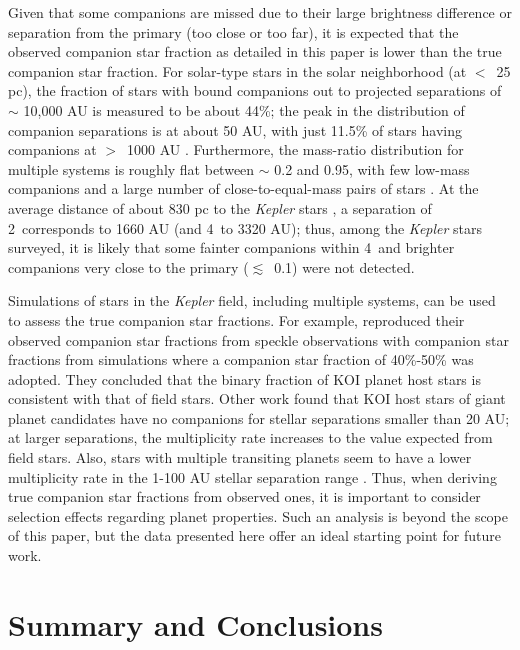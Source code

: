\documentclass[twocolumn,appendixfloats]{aastex6}
\begin{document}
Given that some companions are missed due to their large brightness 
difference or separation from the primary (too close or too far), it is expected 
that the observed companion star fraction as detailed in this paper is lower 
than the true companion star fraction. For solar-type stars in the solar 
neighborhood (at $<$~25 pc), the fraction of stars with bound companions 
out to projected separations of $\sim$ 10,000 AU is measured to be
about 44\%; the peak in the distribution of companion separations is at about 
50 AU, with just 11.5\% of stars having companions at $>$~1000 AU 
\citep{raghavan10}. Furthermore, the mass-ratio distribution for multiple systems 
is roughly flat between $\sim$ 0.2 and 0.95, with few low-mass companions and 
a large number of close-to-equal-mass pairs of stars \citep{raghavan10}. 
At the average distance of about 830 pc to the {\it Kepler} stars \citep{huber14}, 
a separation of 2\arcsec\ corresponds to 1660 AU (and 4\arcsec\ to 3320 AU); 
thus, among the {\it Kepler} stars surveyed, it is likely that some fainter companions 
within 4\arcsec\ and brighter companions very close to the primary 
($\lesssim$~0.1\arcsec) were not detected.

Simulations of stars in the {\it Kepler} field, including multiple systems,
can be used to assess the true companion star fractions. For example,
\citet{horch14} reproduced their observed companion star fractions 
from speckle observations with companion star fractions from simulations
where a companion star fraction of 40\%-50\% was adopted. They 
concluded that the binary fraction of KOI planet host stars is consistent 
with that of field stars. Other work \citep{wang15a} found that KOI
host stars of giant planet candidates have no companions for stellar
separations smaller than 20 AU; at larger separations, the multiplicity
rate increases to the value expected from field stars. Also, stars with 
multiple transiting planets seem to have a lower multiplicity rate in 
the 1-100 AU stellar separation range \citep{wang15b}. Thus, when
deriving true companion star fractions from observed ones, it is 
important to consider selection effects regarding planet properties.
Such an analysis is beyond the scope of this paper, but the data
presented here offer an ideal starting point for future work.


\section{Summary and Conclusions}
\label{conclude}
\end{document}
